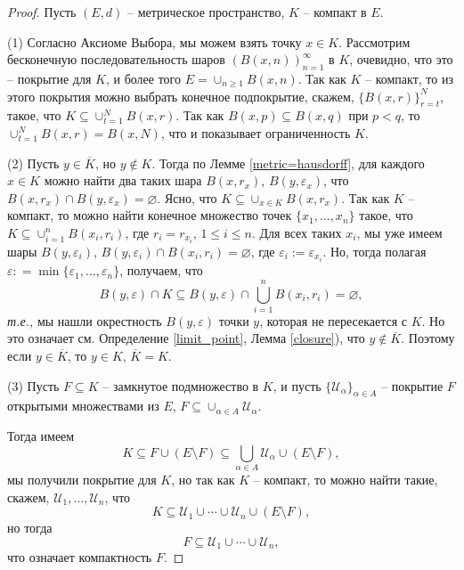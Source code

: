 \begin{proof}
Пусть $(E,d)$ -- метрическое пространство, $K$ -- компакт в $E$.

(1)  Согласно Аксиоме Выбора, мы можем взять точку $x\in K$. Рассмотрим бесконечную последовательность шаров $(B(x,n))_{n=1}^\infty$ в $K$, очевидно, что это -- покрытие для $K$, и более того $E = \cup_{n \ge 1} B(x,n)$. Так как $K$ -- компакт, то из этого покрытия можно выбрать конечное подпокрытие, скажем, $\{B(x,r)\}_{r=t}^N$, такое, что $K \subseteq \cup_{t=1}^N B(x,r)$. Так как $B(x,p) \subseteq B(x,q)$ при $p<q$, то $\cup_{t=1}^N B(x,r) = B(x,N)$, что и показывает ограниченность $K.$

(2) Пусть $y \in \overline{K}$, но $y \notin K$. Тогда по Лемме \ref{metric=hausdorff}, для каждого $x\in K$ можно найти два таких шара $B(x, r_x)$, $B(y, \varepsilon_x)$, что $B(x, r_x) \cap B(y, \varepsilon_x) = \varnothing.$ Ясно, что $K \subseteq \cup_{x \in K} B(x,r_x)$. Так как $K$ -- компакт, то можно найти конечное множество точек $\{x_1,\ldots, x_n\}$ такое, что $K \subseteq \cup_{i=1}^n B(x_i, r_i)$, где $r_i = r_{x_i}$, $1\le i \le n.$ Для всех таких $x_i$, мы уже имеем шары $B(y, \varepsilon_i)$, $B(y,\varepsilon_i) \cap B(x_i, r_i) = \varnothing$, где $\varepsilon_i := \varepsilon_{x_i}$. Но, тогда полагая $\varepsilon: = \min \{\varepsilon_1, \ldots, \varepsilon_n\}$, получаем, что
\[
  B(y, \varepsilon) \cap K \subseteq B(y, \varepsilon) \cap \bigcup_{i=1}^n B(x_i,r_i) = \varnothing,
\]
\textit{т.е.,} мы нашли окрестность $B(y, \varepsilon)$ точки $y$, которая не пересекается с $K$. Но это означает см. Определение \ref{limit_point}, Лемма \ref{closure}), что $y \notin \overline{K}$.  Поэтому если $y\in \overline{K}$, то $y \in K$, \ie $\overline{K} = K.$



(3) Пусть $F \subseteq K$ -- замкнутое подмножество в $K$, и пусть $\{\mathscr{U}_\alpha\}_{\alpha \in A}$ -- покрытие $F$ открытыми множествами из $E$, \ie $F \subseteq \cup_{\alpha \in A} \mathscr{U}_\alpha$.

Тогда имеем
\[
  K \subseteq F \cup (E \setminus F) \subseteq \bigcup_{\alpha \in A} \mathscr{U}_\alpha \cup (E \setminus F),
\]
\ie мы получили покрытие для $K$, но так как $K$ -- компакт, то можно найти такие, скажем, $\mathscr{U}_1, \ldots, \mathscr{U}_n$, что 
\[
 K \subseteq \mathscr{U}_1 \cup \cdots \cup \mathscr{U}_n \cup (E \setminus F),
\]
но тогда 
\[
 F \subseteq \mathscr{U}_1 \cup \cdots \cup \mathscr{U}_n,
\]
что означает компактность $F.$
\end{proof}


